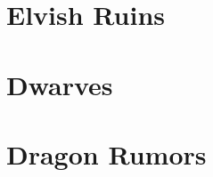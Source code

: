 

\begin{multicols}{2}

\section{Elvish Ruins}


\section{Dwarves}


\section{Dragon Rumors}


\end{multicols}
